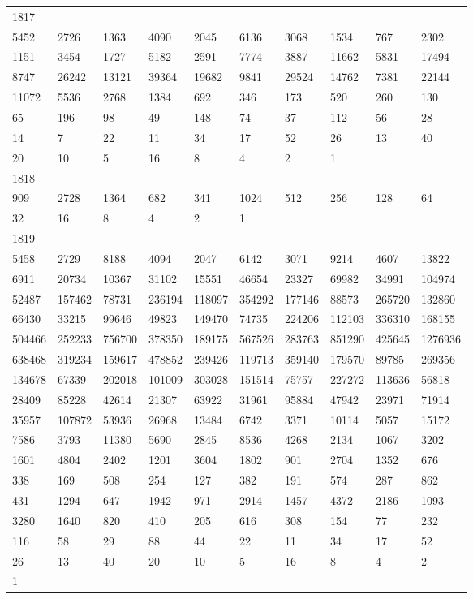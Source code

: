 \begin{longtable}{*{10}{l}}
1817&&&&&&&&&\\
5452& 2726& 1363& 4090& 2045& 6136& 3068& 1534& 767& 2302\\
1151& 3454& 1727& 5182& 2591& 7774& 3887& 11662& 5831& 17494\\
8747& 26242& 13121& 39364& 19682& 9841& 29524& 14762& 7381& 22144\\
11072& 5536& 2768& 1384& 692& 346& 173& 520& 260& 130\\
65& 196& 98& 49& 148& 74& 37& 112& 56& 28\\
14& 7& 22& 11& 34& 17& 52& 26& 13& 40\\
20& 10& 5& 16& 8& 4& 2& 1& \\

1818&&&&&&&&&\\
909& 2728& 1364& 682& 341& 1024& 512& 256& 128& 64\\
32& 16& 8& 4& 2& 1& \\

1819&&&&&&&&&\\
5458& 2729& 8188& 4094& 2047& 6142& 3071& 9214& 4607& 13822\\
6911& 20734& 10367& 31102& 15551& 46654& 23327& 69982& 34991& 104974\\
52487& 157462& 78731& 236194& 118097& 354292& 177146& 88573& 265720& 132860\\
66430& 33215& 99646& 49823& 149470& 74735& 224206& 112103& 336310& 168155\\
504466& 252233& 756700& 378350& 189175& 567526& 283763& 851290& 425645& 1276936\\
638468& 319234& 159617& 478852& 239426& 119713& 359140& 179570& 89785& 269356\\
134678& 67339& 202018& 101009& 303028& 151514& 75757& 227272& 113636& 56818\\
28409& 85228& 42614& 21307& 63922& 31961& 95884& 47942& 23971& 71914\\
35957& 107872& 53936& 26968& 13484& 6742& 3371& 10114& 5057& 15172\\
7586& 3793& 11380& 5690& 2845& 8536& 4268& 2134& 1067& 3202\\
1601& 4804& 2402& 1201& 3604& 1802& 901& 2704& 1352& 676\\
338& 169& 508& 254& 127& 382& 191& 574& 287& 862\\
431& 1294& 647& 1942& 971& 2914& 1457& 4372& 2186& 1093\\
3280& 1640& 820& 410& 205& 616& 308& 154& 77& 232\\
116& 58& 29& 88& 44& 22& 11& 34& 17& 52\\
26& 13& 40& 20& 10& 5& 16& 8& 4& 2\\
1& \\


\end{longtable}
